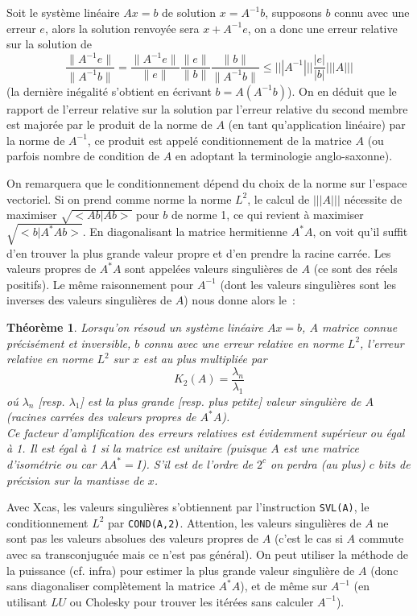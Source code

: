 \documentclass[a4paper,11pt]{article}
\newtheorem{thm}{Théorème}
\begin{document}
Soit le syst\`eme lin\'eaire $Ax=b$ de solution $x=A^{-1}b$, 
supposons $b$ connu avec une erreur $e$, alors la solution renvoy\'ee
sera $x+A^{-1}e$, on a donc une erreur relative sur la solution de 
\[ \frac{\|A^{-1}e\|}{\|A^{-1}b\|} = \frac{\|A^{-1}e\|}{\|e\|} 
\frac{\|e\|}{\|b\|}
\frac{\|b\|}{\|A^{-1}b\|}  \leq |||A^{-1}|||  \frac{|e|}{|b|} |||A|||  \]
(la derni\`ere in\'egalit\'e s'obtient en \'ecrivant $b=A(A^{-1}b)$).
On en d\'eduit que le rapport de l'erreur relative sur la solution par l'erreur
relative du second membre est major\'ee par
le produit de la norme de $A$ (en tant qu'application lin\'eaire)
par la norme de $A^{-1}$, ce produit est appel\'e conditionnement
de la matrice $A$ (ou parfois nombre de condition de $A$ en adoptant
la terminologie anglo-saxonne).

On remarquera que le conditionnement d\'epend du choix de la norme sur
l'espace vectoriel.
Si on prend comme norme la norme $L^2$, le calcul de $|||A|||$
n\'ecessite de maximiser $\sqrt{<Ab|Ab>}$ pour $b$ de norme 1, ce qui revient
\`a maximiser $\sqrt{<b|A^* A b>}$. En diagonalisant la matrice hermitienne
$A^* A$, on voit qu'il suffit d'en trouver la plus grande valeur
propre et d'en prendre la racine carr\'ee. Les valeurs propres de
$A^*A$ sont appel\'ees valeurs singuli\`eres de $A$ (ce sont des
r\'eels positifs). Le m\^eme raisonnement pour $A^{-1}$ (dont les
valeurs singuli\`eres sont les inverses des valeurs singuli\`eres de $A$) nous
donne alors le~:
\begin{thm}
Lorsqu'on r\'esoud un syst\`eme lin\'eaire $Ax=b$, $A$ matrice connue
pr\'ecis\'ement et inversible, $b$ connu avec une erreur relative en
norme $L^2$, l'erreur relative en norme $L^2$ sur $x$ est au plus
multipli\'ee par
\[ K_2(A)= \frac{\lambda_n}{\lambda_1} \]
o\'u $\lambda_n$ [resp. $\lambda_1$] est la plus grande [resp. plus
petite] valeur singuli\`ere de $A$ (racines carr\'ees des
valeurs propres de $A^*A$).\\
Ce facteur d'amplification des erreurs relatives est \'evidemment
sup\'erieur ou \'egal \`a 1. Il est \'egal \`a 1 si la matrice est
unitaire (puisque $A$ est une matrice
d'isométrie ou car $AA^*=I$). 
S'il est de l'ordre de $2^c$ on perdra (au plus) $c$ bits de
pr\'ecision sur la mantisse de $x$.
\end{thm}
Avec Xcas, les valeurs singuli\`eres 
s'obtiennent par l'instruction
\verb|SVL(A)|, le conditionnement $L^2$ par \verb|COND(A,2)|.
Attention, les valeurs singuli\`eres de $A$ ne sont pas les valeurs
absolues des valeurs propres de $A$ (c'est le cas si $A$ 
commute avec sa transconjugu\'ee mais ce n'est pas g\'en\'eral).
On peut utiliser la m\'ethode de la puissance (cf. infra) pour estimer la plus
grande valeur singuli\`ere de $A$ (donc sans diagonaliser compl\`etement
la matrice $A^*A$), et de m\^eme sur $A^{-1}$ (en utilisant $LU$
ou Cholesky pour trouver les it\'er\'ees sans calculer $A^{-1}$).
\end{document}
